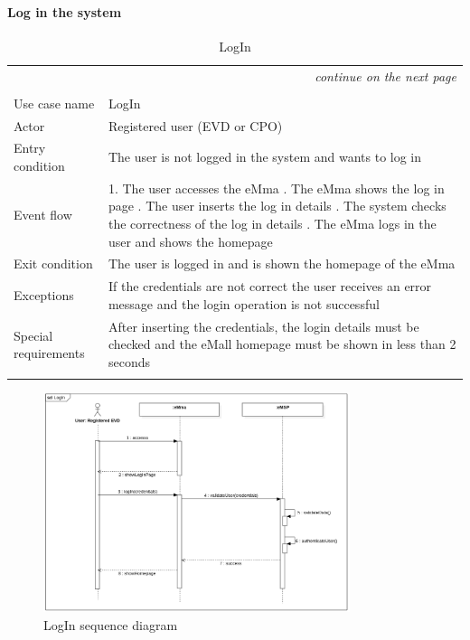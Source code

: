 \paragraph{Log in the system}
\begin{center}
    \begin{longtable}{p{4cm} p{11cm}}
    \multicolumn{2}{r}{\itshape{continue on the next page}}\\
    \endfoot 
    \\
    \endlastfoot
    \hline
     Use case name &  LogIn\\
     \hline
     Actor & Registered user (EVD or CPO)\\
     \hline
     Entry condition &  The user is not logged in the system and wants to log in\\
     \hline
     Event flow &   1. The user accesses the eMma \newline
                    2. The eMma shows the log in page \newline
                    3. The user inserts the log in details \newline
                    4. The system checks the correctness of the log in details \newline
                    5. The eMma logs in the user and shows the homepage\\
     \hline
     Exit condition & The user is logged in and is shown the homepage of the eMma \\
     \hline
     Exceptions &  If the credentials are not correct the user receives an error message and the login operation is not successful \\
     \hline
     Special requirements &  After inserting the credentials, the login details must be checked and the eMall homepage must be shown in less than 2 seconds \\
     \hline
    \caption{LogIn}
    \label{tab:LogIn}
    \end{longtable}
\end{center}

\begin{figure}[H]
    \centering
    \includegraphics[width=0.8\textwidth]{Images/cp3/LogInSD.png}
    \caption{LogIn sequence diagram}
\end{figure}

